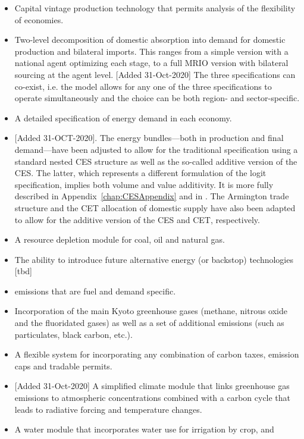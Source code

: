 \documentclass[11pt,letterpaper]{report}
\begin{document}
\begin{itemize}
   \item Capital vintage production technology that permits analysis of the
         flexibility of economies.
   \item {Two-level decomposition of domestic absorption into demand for domestic
         production and bilateral imports. This ranges from a simple version
         with a national agent optimizing each stage, to a full MRIO version
         with bilateral sourcing at the agent level. [Added 31-Oct-2020] The
         three specifications can co-exist, i.e. the model allows for any
         one of the three specifications to operate simultaneously and the choice can
         be both region- and sector-specific.}
   \item A detailed specification of energy demand in each economy.
   \item {[Added 31-OCT-2020]. The energy bundles---both in production and final demand---have been adjusted to allow for the traditional specification using a standard nested CES structure as well as the so-called additive version of the CES. The latter, which represents a different formulation of the logit specification, implies both volume and value additivity. It is more fully described in Appendix~\ref{chap:CESAppendix} and in \cite{DvdMPetersGTWP2020}. The Armington trade structure and
   the CET allocation of domestic supply have also been adapted to allow for the additive version of the CES and CET, respectively.}
   \item A resource depletion module for coal, oil and natural gas.
   \item The ability to introduce future alternative energy (or backstop)
         technologies [tbd]
   \item \COT{} emissions that are fuel and demand specific.
   \item Incorporation of the main Kyoto greenhouse gases (methane, nitrous
         oxide and the fluoridated gases) as well as a set of additional
         emissions (such as particulates, black carbon, etc.).
   \item A flexible system for incorporating any combination of carbon taxes,
         emission caps and tradable permits.
   \item {[Added 31-Oct-2020] A simplified climate module that links greenhouse gas emissions to
         atmospheric concentrations combined with a carbon cycle that leads to
         radiative forcing and temperature changes.}
   \item A water module that incorporates water use for irrigation by crop, and

\end{itemize}
\end{document}
